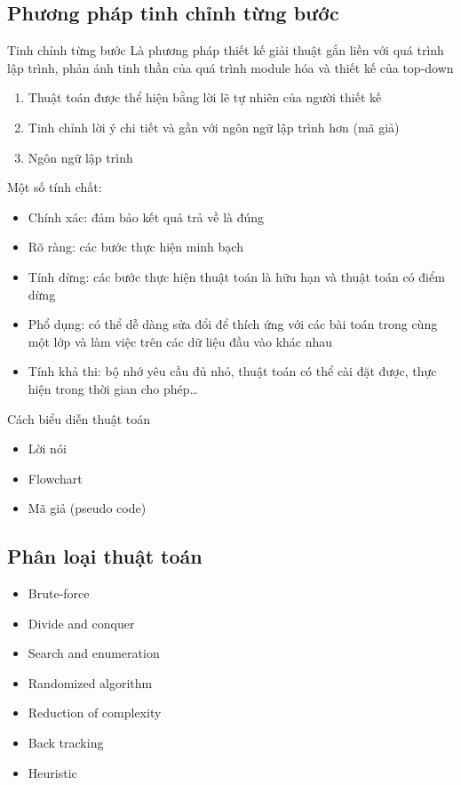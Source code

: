 \documentclass[]{beamer}
\newenvironment{fr}
               {\begin{frame}{\secname}}
               {\end{frame}}
\newenvironment{ffr}
               {\begin{frame}{\subsecname}}
               {\end{frame}}
\begin{document}
\begin{ffr}
\subsection{Phương pháp tinh chỉnh từng bước}
\begin{ffr}
  \begin{block}
    {Tinh chỉnh từng bước} 
    Là phương pháp thiết kế giải thuật gắn liền với quá trình lập trình, phản ánh tinh thần của quá trình module hóa và thiết kế của top-down
  \end{block}
\end{ffr}
\begin{ffr}
\begin{enumerate}
  \item Thuật toán được thể hiện bằng lời lẽ tự nhiên của người thiết kế
  \item Tinh chỉnh lời ý chi tiết và gần với ngôn ngữ lập trình hơn (mã giả)
  \item Ngôn ngữ lập trình
\end{enumerate}
\end{ffr}

\begin{fr}
  Một số tính chất:
  \begin{itemize}
  \item Chính xác: đảm bảo kết quả trả về là đúng
  \item Rõ ràng: các bước thực hiện minh bạch
  \item Tính dừng: các bước thực hiện thuật toán là hữu hạn và thuật toán có điểm dừng
  \item Phổ dụng: có thể dễ dàng sửa đổi để thích ứng với các bài toán trong cùng một lớp và làm việc trên các dữ liệu đầu vào khác nhau
  \item Tính khả thi: bộ nhớ yêu cầu đủ nhỏ, thuật toán có thể cài đặt được, thực hiện trong thời gian cho phép\ldots
  \end{itemize}
  Cách biểu diễn thuật toán 
  \begin{itemize}
  \item Lời nói
  \item Flowchart
  \item Mã giả (pseudo code)
  \end{itemize}
\end{fr}

\subsection{Phân loại thuật toán}
\begin{ffr}
  \begin{itemize}
  \item Brute-force
  \item Divide and conquer
  \item Search and enumeration
  \item Randomized algorithm
  \item Reduction of complexity
  \item Back tracking
  \item Heuristic
  \end{itemize}
\end{ffr}


\end{ffr}
\end{document}
